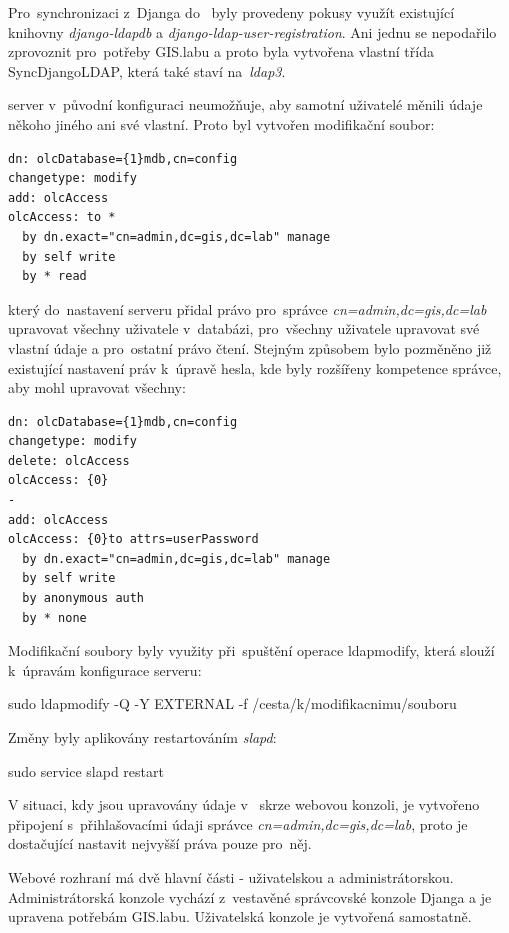 Pro~synchronizaci z~Djanga do~ byly provedeny pokusy využít
existující knihovny \textit{django-ldapdb} a
\textit{django-ldap-user-registration}. Ani jednu se nepodařilo
zprovoznit pro~potřeby GIS.labu a proto byla vytvořena vlastní třída
\textsf{SyncDjangoLDAP}, která také staví na~\textit{ldap3}.

 server v~původní konfiguraci neumožňuje, aby samotní
uživatelé měnili údaje někoho jiného ani své vlastní. Proto byl
vytvořen modifikační soubor:

\begin{verbatim}
dn: olcDatabase={1}mdb,cn=config
changetype: modify
add: olcAccess
olcAccess: to * 
  by dn.exact="cn=admin,dc=gis,dc=lab" manage  
  by self write  
  by * read
\end{verbatim}

který do~nastavení serveru přidal právo pro~správce
\textit{cn=admin,dc=gis,dc=lab} upravovat všechny uživatele 
v~databázi, pro~všechny uživatele upravovat své vlastní údaje a 
pro~ostatní právo čtení. Stejným způsobem bylo pozměněno již existující
nastavení práv k~úpravě hesla, kde byly rozšířeny kompetence správce,
aby mohl upravovat všechny:

\begin{verbatim}
dn: olcDatabase={1}mdb,cn=config
changetype: modify
delete: olcAccess
olcAccess: {0}
-
add: olcAccess
olcAccess: {0}to attrs=userPassword
  by dn.exact="cn=admin,dc=gis,dc=lab" manage
  by self write
  by anonymous auth
  by * none
\end{verbatim}

Modifikační soubory byly využity při~spuštění operace ldapmodify,
která slouží k~úpravám konfigurace  serveru:
\begin{center}
\textsf{sudo ldapmodify -Q -Y EXTERNAL -f /cesta/k/modifikacnimu/souboru}
\end{center}

Změny byly aplikovány restartováním \textit{slapd}:
\begin{center}
\textsf{sudo service slapd restart}
\end{center}

V situaci, kdy jsou upravovány údaje v~ skrze webovou
konzoli, je vytvořeno připojení s~přihlašovacími údaji správce
\textit{cn=admin,dc=gis,dc=lab}, proto je dostačující nastavit
nejvyšší práva pouze pro~něj.

Webové rozhraní má dvě hlavní části - uživatelskou a
administrátorskou. Administrátorská konzole vychází z~vestavěné
správcovské konzole Djanga a je upravena potřebám
GIS.labu. Uživatelská konzole je vytvořená samostatně.

